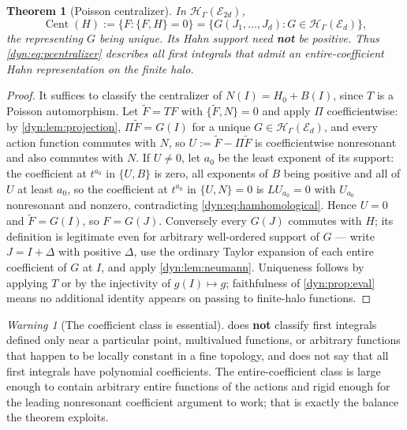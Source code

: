 \documentclass[11pt,letterpaper]{article}
\newtheorem{theorem}{Theorem}[section]
\theoremstyle{definition}
\theoremstyle{remark}
\newtheorem{warning}[warning]{Warning}
\newcommand{\HH}{\mathscr H}
\newcommand{\EE}{\mathscr E}
\newcommand{\Cent}{\operatorname{Cent}}
\numberwithin{equation}{section}
\begin{document}
\begin{theorem}[Poisson centralizer]\label{dyn:thm:pcentralizer}
In $\HH_\Gamma(\EE_{2d})$,
\begin{equation}\label{dyn:eq:pcentralizer}
 \Cent(H):=\{F:\{F,H\}=0\}
 =\{G(J_1,\dots,J_d):G\in\HH_\Gamma(\EE_d)\},
\end{equation}
the representing $G$ being unique. Its Hahn support need \textbf{not} be
positive. Thus \eqref{dyn:eq:pcentralizer} describes all first integrals
that admit an entire-coefficient Hahn representation on the finite halo.
\end{theorem}
\begin{proof}
It suffices to classify the centralizer of $N(I)=H_0+B(I)$, since $T$ is a
Poisson automorphism. Let $\widetilde F=TF$ with
$\{\widetilde F,N\}=0$ and apply $\Pi$ coefficientwise: by
\cref{dyn:lem:projection}, $\Pi\widetilde F=G(I)$ for a unique
$G\in\HH_\Gamma(\EE_d)$, and every action function commutes with $N$, so
$U:=\widetilde F-\Pi\widetilde F$ is coefficientwise nonresonant and also
commutes with $N$. If $U\ne0$, let $a_0$ be the least exponent of its
support: the coefficient at $t^{a_0}$ in $\{U,B\}$ is zero, all exponents
of $B$ being positive and all of $U$ at least $a_0$, so the coefficient at
$t^{a_0}$ in $\{U,N\}=0$ is $LU_{a_0}=0$ with $U_{a_0}$ nonresonant and
nonzero, contradicting \eqref{dyn:eq:hamhomological}. Hence $U=0$ and
$\widetilde F=G(I)$, so $F=G(J)$. Conversely every $G(J)$ commutes with
$H$; its definition is legitimate even for arbitrary well-ordered support
of $G$ --- write $J=I+\Delta$ with positive $\Delta$, use the ordinary
Taylor expansion of each entire coefficient of $G$ at $I$, and apply
\cref{dyn:lem:neumann}. Uniqueness follows by applying $T$ or by the
injectivity of $g(I)\mapsto g$; faithfulness of \cref{dyn:prop:eval} means
no additional identity appears on passing to finite-halo functions.
\end{proof}

\begin{warning}[The coefficient class is essential]\label{dyn:warn:pcent}
 does \textbf{not} classify first integrals
defined only near a particular point, multivalued functions, or arbitrary
functions that happen to be locally constant in a fine topology, and does
not say that all first integrals have polynomial coefficients. The
entire-coefficient class is large enough to contain arbitrary entire
functions of the actions and rigid enough for the leading nonresonant
coefficient argument to work; that is exactly the balance the theorem
exploits.
\end{warning}
\end{document}

